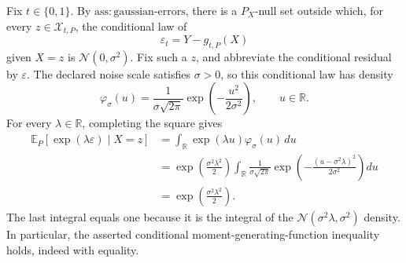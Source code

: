 Fix \(t\in\{0,1\}\). By \(\mathrm{ass:gaussian\text{-}errors}\), there is a \(P_X\)-null set outside which, for every \(z\in\mathcal X_{t,P}\), the conditional law of
\[
 \varepsilon_t=Y-g_{t,P}(X)
\]
given \(X=z\) is \(\mathcal N(0,\sigma^2)\). Fix such a \(z\), and abbreviate the conditional residual by \(\varepsilon\). The declared noise scale satisfies \(\sigma>0\), so this conditional law has density
\[
 \varphi_\sigma(u)=\frac{1}{\sigma\sqrt{2\pi}}\exp\!\left(-\frac{u^2}{2\sigma^2}\right),\qquad u\in\mathbb R.
\]
For every \(\lambda\in\mathbb R\), completing the square gives
\[
 \begin{aligned}
 \mathbb E_P[\exp(\lambda\varepsilon)\mid X=z]
 &=\int_{\mathbb R}\exp(\lambda u)\varphi_\sigma(u)\,du\\
 &=\exp\!\left(\frac{\sigma^2\lambda^2}{2}\right)
   \int_{\mathbb R}\frac{1}{\sigma\sqrt{2\pi}}
   \exp\!\left(-\frac{(u-\sigma^2\lambda)^2}{2\sigma^2}\right)du\\
 &=\exp\!\left(\frac{\sigma^2\lambda^2}{2}\right).
 \end{aligned}
\]
The last integral equals one because it is the integral of the \(\mathcal N(\sigma^2\lambda,\sigma^2)\) density. In particular, the asserted conditional moment-generating-function inequality holds, indeed with equality.

